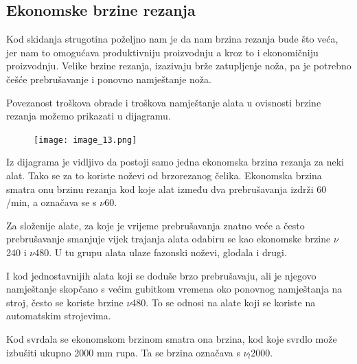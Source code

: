 \documentclass[a4paper,12pt]{article}
\numberwithin{figure}{section}
\begin{document}
\subsection{Ekonomske brzine rezanja}
Kod skidanja strugotina poželjno nam je da nam brzina rezanja bude što veća, jer nam to omogućava produktivniju proizvodnju a kroz to i ekonomičniju proizvodnju. Velike brzine rezanja, izazivaju brže zatupljenje noža, pa je potrebno češće prebrušavanje i ponovno namještanje noža. \par
Povezanost troškova obrade i troškova namještanje alata u ovisnosti brzine rezanja možemo prikazati u dijagramu.
\begin{figure}[!h]
\centering
\texttt{[image: image\_13.png]}
\end{figure}
\FloatBarrier
Iz dijagrama je vidljivo da postoji samo jedna ekonomska brzina rezanja za neki alat. Tako se za to koriste noževi od brzorezanog čelika. Ekonomska brzina smatra onu brzinu rezanja kod koje alat između dva prebrušavanja izdrži 60 /min, a označava se s ${\nu}$60.\par 
Za složenije alate, za koje je vrijeme prebrušavanja znatno veće a često prebrušavanje smanjuje vijek trajanja alata odabiru se kao ekonomske brzine ${\nu}$240 i ${\nu}$480. U tu grupu alata ulaze fazonski noževi, glodala i drugi. \par
I kod jednostavnijih alata koji se doduše brzo prebrušavaju, ali je njegovo namještanje skopčano s većim gubitkom vremena oko ponovnog namještanja na stroj, često se koriste brzine ${\nu}$480. To se odnosi na alate koji se koriste na automatskim strojevima. \par
Kod svrdala se ekonomskom brzinom smatra ona brzina, kod koje svrdlo može izbušiti ukupno 2000 mm rupa. Ta se brzina označava s ${\nu_{l}}$2000.
\end{document}
